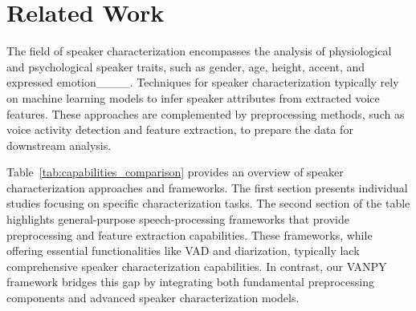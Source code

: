 \section{Related Work}
\label{sec:rw}
The field of speaker characterization encompasses the analysis of physiological and psychological speaker traits, such as gender, age, height, accent, and expressed emotion____. Techniques for speaker characterization typically rely on machine learning models to infer speaker attributes from extracted voice features. These approaches are complemented by preprocessing methods, such as voice activity detection and feature extraction, to prepare the data for downstream analysis.

Table~\ref{tab:capabilities_comparison} provides an overview of speaker characterization approaches and frameworks. The first section presents individual studies focusing on specific characterization tasks.
The second section of the table highlights general-purpose speech-processing frameworks that provide preprocessing and feature extraction capabilities. These frameworks, while offering essential functionalities like VAD and diarization, typically lack comprehensive speaker characterization capabilities. In contrast, our VANPY framework bridges this gap by integrating both fundamental preprocessing components and advanced speaker characterization models.

